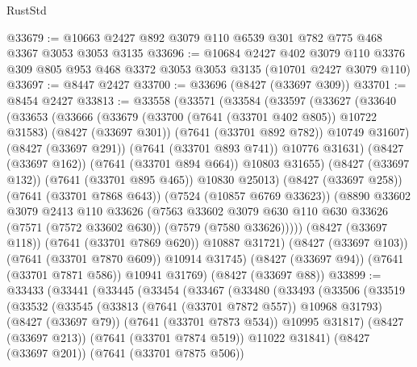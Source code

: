 \begin{lexlean}{RustStd}
\begin{coremodule}
{\begin{coremodule}
{{{{{{{{{{{{{{{{{{{{{{{{{{{{{{{{@33679 := @10663 @2427 @892 @3079 @110 @6539 @301 @782 @775 @468 @3367 @3053 @3053 @3135
@33696 := @10684
    @2427
    @402
    @3079
    @110
    @3376
    @309
    @805
    @953
    @468
    @3372
    @3053
    @3053
    @3135
    (@10701 @2427 @3079 @110)
@33697 := @8447 @2427
@33700 := @33696 (@8427 (@33697 @309))
@33701 := @8454 @2427
@33813 := @33558
    (@33571
      (@33584
        (@33597
          (@33627
            (@33640
              (@33653
                (@33666
                  (@33679
                    (@33700 (@7641 (@33701 @402 @805)) @10722 @31583)
                    (@8427 (@33697 @301))
                    (@7641 (@33701 @892 @782))
                    @10749
                    @31607)
                  (@8427 (@33697 @291))
                  (@7641 (@33701 @893 @741))
                  @10776
                  @31631)
                (@8427 (@33697 @162))
                (@7641 (@33701 @894 @664))
                @10803
                @31655)
              (@8427 (@33697 @132))
              (@7641 (@33701 @895 @465))
              @10830
              @25013)
            (@8427 (@33697 @258))
            (@7641 (@33701 @7868 @643))
            (@7524 (@10857 @6769 @33623))
            (@8890
              @33602
              @3079
              @2413
              @110
              @33626
              (@7563
                @33602
                @3079
                @630
                @110
                @630
                @33626
                (@7571 (@7572 @33602 @630))
                (@7579 (@7580 @33626)))))
          (@8427 (@33697 @118))
          (@7641 (@33701 @7869 @620))
          @10887
          @31721)
        (@8427 (@33697 @103))
        (@7641 (@33701 @7870 @609))
        @10914
        @31745)
      (@8427 (@33697 @94))
      (@7641 (@33701 @7871 @586))
      @10941
      @31769)
    (@8427 (@33697 @88))
@33899 := @33433
    (@33441
      (@33445
        (@33454
          (@33467
            (@33480
              (@33493
                (@33506
                  (@33519
                    (@33532
                      (@33545
                        (@33813 (@7641 (@33701 @7872 @557)) @10968 @31793)
                        (@8427 (@33697 @79))
                        (@7641 (@33701 @7873 @534))
                        @10995
                        @31817)
                      (@8427 (@33697 @213))
                      (@7641 (@33701 @7874 @519))
                      @11022
                      @31841)
                    (@8427 (@33697 @201))
                    (@7641 (@33701 @7875 @506))
}}}}}}}}}}}}}}}}}}}}}}}}}}}}}}}}
\end{coremodule}}
\end{coremodule}
\end{lexlean}
